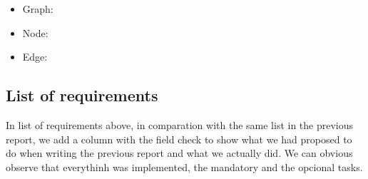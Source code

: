 \documentclass[a4paper]{article}
\begin{document}

\begin{itemize}
\item Graph:

\item Node:

\item Edge:

 
\end{itemize}


\subsection{List of requirements}\label{subsecsec:requirements}

In list of requirements above, in comparation with the same list in the previous report, we add a column with the field check to show what we had proposed to do when writing the previous report and what we actually did.
We can obvious observe that everythinh was implemented, the mandatory and the opcional tasks.
\end{document}
